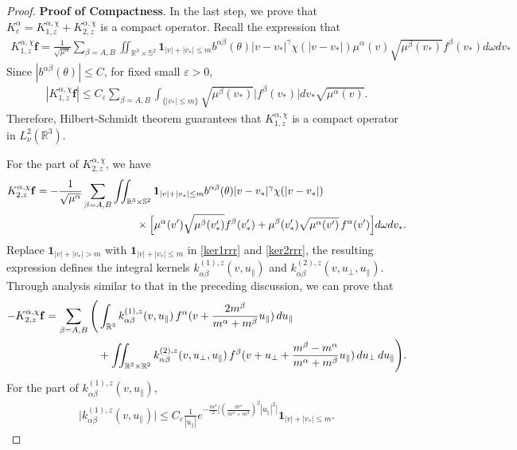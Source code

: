 \documentclass[reqno]{amsart}
\numberwithin{equation}{section}
\numberwithin{equation}{section}
\begin{document}
\begin{proof}
	\noindent	\textbf{Proof of Compactness}.\hspace{0.05cm}	In the last step, we prove that $K^{\alpha}_c = K_{1,z}^{\alpha,\chi}+K_{2,z}^{\alpha,\chi}$ is a compact operator. 
	Recall the expression that
		\begin{align*}
			 K_{1,z}^{\alpha,\chi} \mathbf{f}=  \frac{1}{\sqrt{\mu^\alpha}} \sum_{\beta=A,B} \iint_{\mathbb{R}^3 \times \mathbb{S}^2}\mathbf{1}_{|v|+|v_*|\leq m}
			b^{ \alpha \beta}(\theta)|v-v_*|^{\gamma} \chi(|v-v_*|) \mu^\alpha(v) \sqrt{\mu^\beta(v_*)}f^\beta(v_*)   d\omega dv_*
		\end{align*}
		Since $|b^{ \alpha \beta}(\theta)|\leq C$, for fixed small $\varepsilon>0$, 
		\begin{align*}
			|K_{1,z}^{\alpha,\chi} \mathbf{f}|\leq C_{\varepsilon} \sum_{\beta=A,B} \int_{\{|v_*|\leq m\}}
			 \sqrt{\mu^\beta(v_*)} \big|f^\beta(v_*)\big|  dv_*\sqrt{\mu^\alpha(v)}.
		\end{align*}
		Therefore, Hilbert-Schmidt theorem guarantees that $K_{1,z}^{\alpha,\chi}$ is a compact operator in $L^2_{\nu}(\mathbb{R}^3)$. 
		
		For the part of $K_{2,z}^{\alpha,\chi}$, we have
		\begin{align}
		K_{2,z}^{\alpha,\chi} \mathbf{f}&= - \frac{1}{\sqrt{\mu^\alpha}} \sum_{\beta=A,B} \iint_{\mathbb{R}^3 \times \mathbb{S}^2}\mathbf{1}_{|v|+|v_*|\leq m}
		b^{ \alpha \beta}(\theta)|v-v_*|^{\gamma}\chi(|v-v_*|)\notag\\ 
		&\hspace{3.3cm}\times \Big[\mu^\alpha(v')\sqrt{\mu^\beta(v_*')}f^\beta(v_*')
		  +\mu^{\beta}(v_*') \sqrt{\mu^{\alpha}(v')}\, f^\alpha(v')\Big] d\omega dv_*.\label{lem2KZZZC}
		\end{align}
		Replace ‌$\mathbf{1}_{|v|+|v_*|> m}$ with ‌$\mathbf{1}_{|v|+|v_*|\leq m}$ in ‌\eqref{ker1rrr} and \eqref{ker2rrr}, the resulting expression defines the integral kernels $k_{\alpha \beta}^{(1),z}(v,u_{\parallel})$ and $k_{\alpha \beta}^{(2),z}(v,u_{\perp},u_{\parallel})$.
		 Through analysis similar to that in the preceding discussion, we can prove that
		\begin{align}
			-K_{2,z}^{\alpha,\chi} \mathbf{f}&=   \sum_{\beta=A,B} \Bigg(\int_{\mathbb{R}^3}k_{\alpha \beta}^{(1),z}(v,u_{\parallel})\,f^\alpha(v + \frac{2m^{\beta}}{m^{\alpha}+m^{\beta}}u_{\parallel}) \,d u_{\parallel}\notag\\ 
			&\hspace{1.7cm}+\iint_{\mathbb{R}^3\times\mathbb{R}^2}k_{\alpha \beta}^{(2),z}(v,u_{\perp},u_{\parallel}) \,f^\beta(v + u_{\perp}+\frac{m^{\beta}-m^{\alpha}}{m^{\alpha}+m^{\beta}}u_{\parallel})\,du_{\perp}\,d u_{\parallel}\Bigg).\label{lem2KZZZC}
		\end{align}
		For the part of $k_{\alpha \beta}^{(1),z}(v,u_{\parallel})$, 
		\begin{align*}
			\big|k_{\alpha \beta}^{(1),z}(v,u_{\parallel})\big|\leq C_{\varepsilon}\frac{1}{|u_{\parallel}|} e^{-\frac{m^\beta}{2}\big[(\frac{m^\alpha}{m^\alpha+m^\beta})^2|u_{\parallel}|^2\big]}\mathbf{1}_{|v|+|v_*|\leq m}.
		\end{align*}
		

\end{proof}
\end{document}
